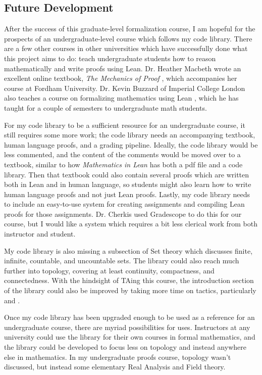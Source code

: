 \subsection{Future Development}

After the success of this graduate-level formalization course, I am
hopeful for the prospects of an undergraduate-level course which
follows my code library. There are a few other courses in other
universities which have successfully done what this project aims to do:
teach undergraduate students how to reason mathematically and write proofs
using Lean. Dr. Heather Macbeth wrote an excellent online textbook, 
\textit{The Mechanics of Proof} \cite{Macbeth}, 
which accompanies her course at Fordham University. 
Dr. Kevin Buzzard of Imperial College London also teaches a course on 
formalizing mathematics using Lean \cite{Buzzard}, 
which he has taught for a couple of 
semesters to undergraduate math students. 

For my code library to be a sufficient resource for an undergraduate course, 
it still requires some more work; the code library needs an accompanying 
textbook, human language proofs, and a grading pipeline. Ideally, the code
library would be less commented, and the content of the comments would be moved
over to a textbook, similar to how \textit{Mathematics in Lean} has both a pdf file
and a code library. Then that textbook could also contain several proofs which
are written both in Lean and in human language, so students might also
learn how to write human language proofs and not just Lean proofs. Lastly, 
my code library needs to include an easy-to-use system for creating assignments
and compiling Lean proofs for those assignments. Dr. Cherkis used Gradescope to
do this for our course, but I would like a system which requires a bit less clerical
work from both instructor and student.

My code library is also missing a subsection of Set theory which discusses
finite, infinite, countable, and uncountable sets. The library could also
reach much further into topology, covering at least continuity, compactness, and
connectedness. With the hindsight of TAing this course, the introduction section 
of the library could also be improved by taking more time on tactics, 
particularly  and .

Once my code library has been upgraded enough to be used as a reference for
an undergraduate course, there are myriad possibilities for uses.
Instructors at any university could use the library for their own courses
in formal mathematics, and the library could be developed to focus less on
topology and instead anywhere else in mathematics. In my undergraduate proofs
course, topology wasn't discussed, but instead some elementary Real Analysis and
Field theory. 

